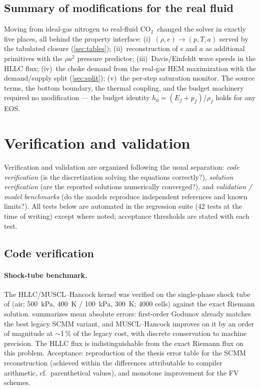 \documentclass[11pt]{article}
\newcommand{\co}{CO$_2$}
\begin{document}
\subsection{Summary of modifications for the real fluid}
\label{sec:realmods}

Moving from ideal-gas nitrogen to real-fluid \co\ changed the solver
in exactly five places, all behind the property interface:
(i)~$(\rho,e)\to(p,T,a)$ served by the tabulated closure
(\cref{sec:tables}); (ii)~reconstruction of $e$ and $a$ as additional
primitives with the $\rho a^2$ pressure predictor; (iii)~Davis/Einfeldt
wave speeds in the HLLC flux; (iv)~the choke demand from the real-gas
HEM maximization with the demand/supply split (\cref{sec:split});
(v)~the per-step saturation monitor. The source terms, the bottom
boundary, the thermal coupling, and the budget machinery required no
modification --- the budget identity $h_0 = (E_f+p_f)/\rho_f$ holds
for any EOS.

\section{Verification and validation}
\label{sec:vv}

Verification and validation are organized following the usual
separation: \emph{code verification} (is the discretization solving
the equations correctly?), \emph{solution verification} (are the
reported solutions numerically converged?), and \emph{validation /
model benchmarks} (do the models reproduce independent references and
known limits?). All tests below are automated in the regression suite
(42 tests at the time of writing) except where noted; acceptance
thresholds are stated with each test.

\subsection{Code verification}
\label{sec:vv-code}

\paragraph{Shock-tube benchmark.} The HLLC/MUSCL--Hancock kernel was
verified on the single-phase shock tube of \citet{gessner2010} (air;
\SI{500}{kPa}, \SI{400}{K} / \SI{100}{kPa}, \SI{300}{K}; 4000 cells)
against the exact Riemann solution.  summarizes
mean absolute errors: first-order Godunov already matches the best
legacy SCMM variant, and MUSCL--Hancock improves on it by an order of
magnitude at $\sim$1\,\% of the legacy cost, with discrete
conservation to machine precision. The HLLC flux is indistinguishable
from the exact Riemann flux on this problem. Acceptance: reproduction
of the thesis error table for the SCMM reconstruction (achieved within
the differences attributable to compiler arithmetic, cf.\ parenthetical
values), and monotone improvement for the FV schemes.
\end{document}
